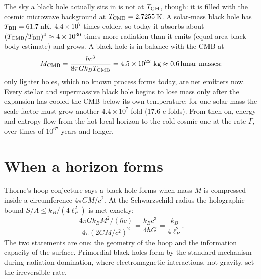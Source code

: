 The sky a black hole actually sits in is not at $T_{\rm GH}$, though: it is filled with the cosmic microwave background at $T_{\rm CMB}=2.7255$\,K. A
solar-mass black hole has $T_{\rm BH}=61.7$\,nK, $4.4\times10^{7}$ times colder, so today it absorbs about $(T_{\rm CMB}/T_{\rm BH})^4\approx4\times10^{30}$
times more radiation than it emits (equal-area black-body estimate) and grows. A black hole is in balance with the CMB at
\begin{equation}M_{\rm CMB}=\frac{\hbar c^3}{8\pi Gk_BT_{\rm CMB}}=4.5\times10^{22}\ \text{kg}\approx0.6\,\text{lunar masses};\end{equation}
only lighter holes, which no known process forms today, are net emitters now. Every stellar and supermassive black hole begins to lose mass only after
the expansion has cooled the CMB below its own temperature: for one solar mass the scale factor must grow another $4.4\times10^{7}$-fold (17.6 e-folds). From then on,
energy and entropy flow from the hot local horizon to the cold cosmic one at the rate $\Gamma$, over times of $10^{67}$ years and longer.

\section{When a horizon forms}
Thorne's hoop conjecture says a black hole forms when mass $M$ is compressed inside a circumference $4\pi GM/c^2$. At the Schwarzschild radius the
holographic bound $S/A\le k_B/(4\ell_P^2)$ is met exactly:
\begin{equation}
\frac{4\pi Gk_BM^2/(\hbar c)}{4\pi(2GM/c^2)^2}=\frac{k_Bc^3}{4\hbar G}=\frac{k_B}{4\ell_P^2}.
\end{equation}
The two statements are one: the geometry of the hoop and the information capacity of the surface. Primordial black holes form by the standard
mechanism during radiation domination, where electromagnetic interactions, not gravity, set the irreversible rate.

